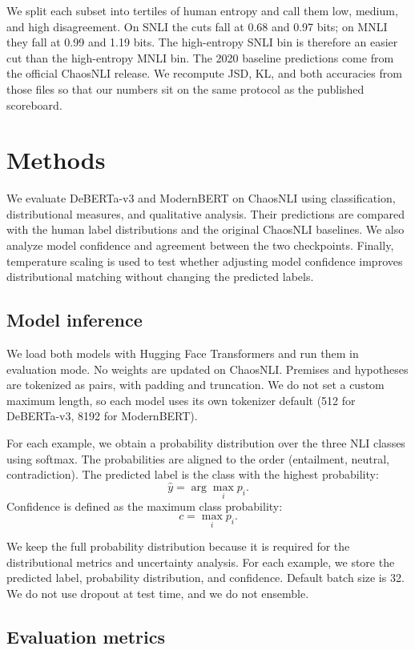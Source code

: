 \documentclass[11pt,a4paper]{article}
\begin{document}
We split each subset into tertiles of human entropy and call them low, medium, and high disagreement. On SNLI the cuts fall at 0.68 and 0.97 bits; on MNLI they fall at 0.99 and 1.19 bits. The high-entropy SNLI bin is therefore an easier cut than the high-entropy MNLI bin. The 2020 baseline predictions come from the official ChaosNLI release. We recompute JSD, KL, and both accuracies from those files so that our numbers sit on the same protocol as the published scoreboard.

\section{Methods}

We evaluate DeBERTa-v3 and ModernBERT on ChaosNLI using classification, distributional measures, and qualitative analysis. Their predictions are compared with the human label distributions and the original ChaosNLI baselines. We also analyze model confidence and agreement between the two checkpoints. Finally, temperature scaling is used to test whether adjusting model confidence improves distributional matching without changing the predicted labels.

\subsection{Model inference}

We load both models with Hugging Face Transformers and run them in evaluation mode. No weights are updated on ChaosNLI. Premises and hypotheses are tokenized as pairs, with padding and truncation. We do not set a custom maximum length, so each model uses its own tokenizer default (512 for DeBERTa-v3, 8192 for ModernBERT).

For each example, we obtain a probability distribution over the three NLI classes using softmax. The probabilities are aligned to the order (entailment, neutral, contradiction). The predicted label is the class with the highest probability:
\[
\hat{y} = \arg\max_i p_i.
\]
Confidence is defined as the maximum class probability:
\[
c = \max_i p_i.
\]

We keep the full probability distribution because it is required for the distributional metrics and uncertainty analysis. For each example, we store the predicted label, probability distribution, and confidence. Default batch size is 32. We do not use dropout at test time, and we do not ensemble.

\subsection{Evaluation metrics}
\end{document}
